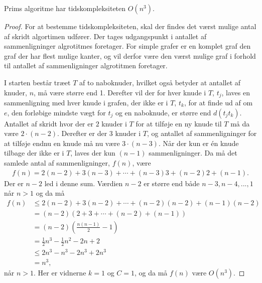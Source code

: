 \begin{thm}
	Prims algoritme har tidskompleksiteten $O (n^3)$.
	\label{prim_kompl}
\end{thm}
\begin{proof}
	For at bestemme tidskompleksiteten, skal der findes det værst mulige antal af skridt algortimen udfører.
	Der tages udgangspunkt i antallet af sammenligninger algrotitmes foretager.
	For simple grafer er en komplet graf den graf der har flest mulige kanter, og vil derfor være den værst mulige graf i forhold til antallet af sammenligninger algrotitmen foretager.

	I starten består træet $T$ af to naboknuder, hvilket også betyder at antallet af knuder, $n$, må være større end 1.
	Derefter vil der for hver knude i $T$, $t_j$, laves en sammenligning med hver knude i grafen, der ikke er i $T$, $t_k$, for at finde ud af om $e$, den forløbige mindste vægt for $t_j$ og en naboknude, er større end $d(t_j t_k)$.
	Antallet af skridt hvor der er $2$ knuder i $T$ for at tilføje en ny knude til $T$ må da være $2 \cdot (n - 2)$.
	Derefter er der $3$ knuder i $T$, og antallet af sammenligninger for at tilføje endnu en knude må nu være $3 \cdot (n - 3)$.
	Når der kun er én knude tilbage der ikke er i $T$, laves der kun $(n-1)$ sammenligninger.
	Da må det samlede antal af sammenligninger, $f(n)$, være
	\begin{align*}
		f(n) = 2 (n-2) + 3(n-3) + \dotsb + (n-3) 3 + (n-2) 2 + (n -1).
	\end{align*}
	Der er $n -2$ led i denne sum. Værdien $n-2$ er større end både $n-3, n-4, ..., 1$ når $n > 1$ og da må
	\begin{align*}
		f(n)
		&\leq 2 (n-2) + 3 (n-2) + \dotsb + (n-2) (n-2) + (n-1) (n-2) \\
		&= (n-2) \left( 2 + 3 + \dotsb + (n-2) + (n-1) \right) \\
		&= (n-2) \left( \frac{n(n-1)}{2} - 1 \right) \\
		&= \frac{1}{2} n^3 - \frac{1}{2} n^2 - 2n + 2 \\
		&\leq 2n^3 - n^3 - 2n^3 + 2n^3 \\
		&= n^3,
	\end{align*}
	når $n > 1$. Her er vidnerne $k=1$ og $C=1$, og da må $f(n)$ være $O(n^3)$.
\end{proof}
